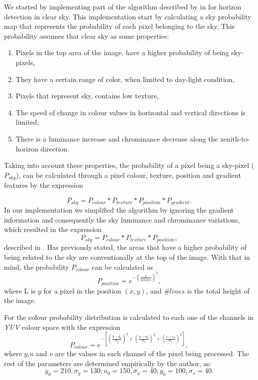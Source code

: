 We started by implementing part of the algorithm described by \citeauthor{zafarifar2008horizon} in \cite{zafarifar2008horizon} for horizon detection in clear sky. This implementation start by calculating a sky probability map that represents the probability of each pixel belonging to the sky. This probability assumes that clear sky as some properties:
\begin{enumerate}
	\item Pixels in the top area of the image, have a higher probability of being sky-pixels,
	\item They have a certain range of color, when limited to day-light condition,
	\item Pixels that represent sky, contains low texture,
	\item The speed of change in colour values in horizontal and vertical directions is limited,
	\item There is a luminance increase and chrominance decrease along the zenith-to-horizon direction.
\end{enumerate}
Taking into account these properties, the probability of a pixel being a sky-pixel ($P_{sky}$), can be calculated through a pixel colour, texture, position and gradient features by the expression

\begin{equation}
	P_{sky} = P_{colour} * P_{texture} * P_{position} * P_{gradient}.
\end{equation}
In our implementation we simplified the algorithm by ignoring the gradient information and consequently the sky luminance and chrominance variations, which resulted in the expression
\begin{equation}
	P_{sky} = P_{colour} * P_{texture} * P_{position},
\end{equation}
described in \cite{herman2003adaptive}. Has previously stated, the areas that have a higher probability of being related to the sky are conventionally at the top of the image. With that in mind, the probability $P_{colour}$ can be calculated as
\begin{equation}
	P_{position} = e^{- \left( \frac{L}{\#lines} \right)^2},
	\label{eq:colour_sky}
\end{equation}
where L is $y$ for a pixel in the position $(x,y)$, and $\#lines$ is the total height of the image.

For the colour probability distribution is calculated to each one of the channels in \emph{YUV} colour space with the expression
\begin{equation}
	P_{colour} =  e^{- \left[ \left(\frac{y-y_{0}}{\sigma_{y}} \right)^2 + \left(\frac{u-u_{0}}{\sigma_{u}} \right)^2 + \left(\frac{v-v_{0}}{\sigma_{v}} \right)^2\right]},
\end{equation}
where $y$,$u$ and $v$ are the values in each channel of the pixel being processed. The rest of the parameters are determined empirically by the author, as:
\begin{equation}
	y_{0} = 210, \sigma_{y}=130;
	u_{0} = 150, \sigma_{u}=40;
	y_{0} = 100, \sigma_{v}=40.
\end{equation}


